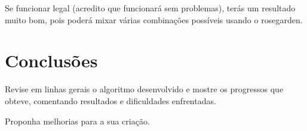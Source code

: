 \documentclass[12pt]{report}
\begin{document}
Se funcionar legal (acredito que funcionará sem problemas), terás um
resultado muito bom, pois poderá mixar várias combinações possíveis
usando o rosegarden.

\chapter{Conclusões}
\label{cha:conclusoes}

Revise em linhas gerais o algoritmo desenvolvido e mostre os
progressos que obteve, comentando resultados e dificuldades
enfrentadas.

Proponha melhorias para a sua criação.


\end{document}
